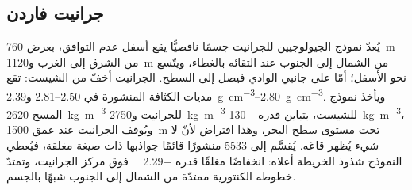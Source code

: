 \begin{omfigure}
\par{}\label{fig:b3:field-lab-methods-3:survey}
\end{omfigure}

\subsection{جرانيت فاردن}

يُعدّ نموذج الجيولوجيين للجرانيت جسمًا ناقصيًّا يقع أسفل عدم التوافق،
بعرض \qty{760}{m} من الشرق إلى الغرب و\qty{1120}{m}
من الشمال إلى الجنوب عند التقائه بالغطاء، ويتّسع نحو الأسفل؛ أمّا على
جانبي الوادي فيصل إلى السطح. الجرانيت أخفّ من الشيست:
تقع مديات الكثافة المنشورة في \numrange{2.50}{2.81}
و\qtyrange{2.39}{2.80}{g.cm^{-3}}. ويأخذ نموذج المسح
\qty{2620}{kg.m^{-3}} للجرانيت و\qty{2750}{kg.m^{-3}} للشيست،
بتباين قدره \qty{-130}{kg.m^{-3}}، ويُوقف الجرانيت عند
عمق \qty{1500}{m} تحت مستوى سطح البحر، وهذا افتراض لأنّ لا شيء يُظهر
قاعَه. يُقسَّم إلى \num{5533} منشورًا قائمًا جواذبها ذات صيغة مغلقة،
فيُعطي النموذج شذوذ الخريطة أعلاه: انخفاضًا مغلقًا قدره
\qty{-2.29}{\milli\gal} فوق مركز الجرانيت، وتمتدّ خطوطه الكنتورية
ممتدّة من الشمال إلى الجنوب شبهًا بالجسم.

